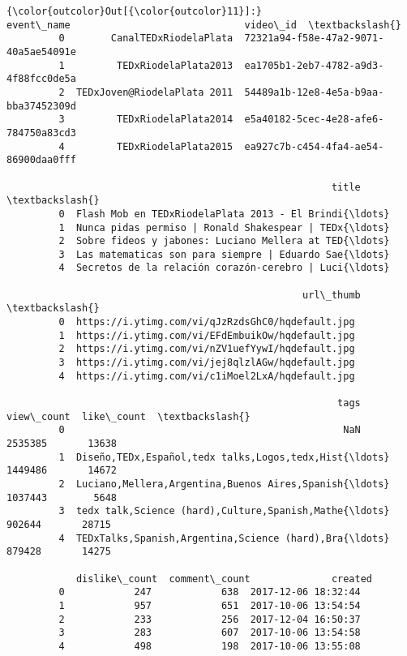 \documentclass[11pt]{article}
\begin{document}
\begin{Verbatim}[commandchars=\\\{\}]
{\color{outcolor}Out[{\color{outcolor}11}]:}                     event\_name                              video\_id  \textbackslash{}
         0        CanalTEDxRiodelaPlata  72321a94-f58e-47a2-9071-40a5ae54091e   
         1         TEDxRiodelaPlata2013  ea1705b1-2eb7-4782-a9d3-4f88fcc0de5a   
         2  TEDxJoven@RiodelaPlata 2011  54489a1b-12e8-4e5a-b9aa-bba37452309d   
         3         TEDxRiodelaPlata2014  e5a40182-5cec-4e28-afe6-784750a83cd3   
         4         TEDxRiodelaPlata2015  ea927c7b-c454-4fa4-ae54-86900daa0fff   
         
                                                        title  \textbackslash{}
         0  Flash Mob en TEDxRiodelaPlata 2013 - El Brindi{\ldots}   
         1  Nunca pidas permiso | Ronald Shakespear | TEDx{\ldots}   
         2  Sobre fideos y jabones: Luciano Mellera at TED{\ldots}   
         3  Las matematicas son para siempre | Eduardo Sae{\ldots}   
         4  Secretos de la relación corazón-cerebro | Luci{\ldots}   
         
                                                   url\_thumb  \textbackslash{}
         0  https://i.ytimg.com/vi/qJzRzdsGhC0/hqdefault.jpg   
         1  https://i.ytimg.com/vi/EFdEmbuikOw/hqdefault.jpg   
         2  https://i.ytimg.com/vi/nZV1uefYywI/hqdefault.jpg   
         3  https://i.ytimg.com/vi/jej8qlzlAGw/hqdefault.jpg   
         4  https://i.ytimg.com/vi/c1iMoel2LxA/hqdefault.jpg   
         
                                                         tags  view\_count  like\_count  \textbackslash{}
         0                                                NaN     2535385       13638   
         1  Diseño,TEDx,Español,tedx talks,Logos,tedx,Hist{\ldots}     1449486       14672   
         2  Luciano,Mellera,Argentina,Buenos Aires,Spanish{\ldots}     1037443        5648   
         3  tedx talk,Science (hard),Culture,Spanish,Mathe{\ldots}      902644       28715   
         4  TEDxTalks,Spanish,Argentina,Science (hard),Bra{\ldots}      879428       14275   
         
            dislike\_count  comment\_count              created  
         0            247            638  2017-12-06 18:32:44  
         1            957            651  2017-10-06 13:54:54  
         2            233            256  2017-12-04 16:50:37  
         3            283            607  2017-10-06 13:54:58  
         4            498            198  2017-10-06 13:55:08  
\end{Verbatim}
            
\end{document}
